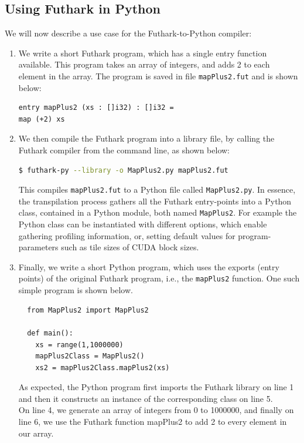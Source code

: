 \subsection{Using Futhark in Python}
We will now describe a use case for the Futhark-to-Python compiler:
\begin{enumerate}
\item We write a short Futhark program, which has a single entry function
    available. This program takes an array of integers, and
    adds 2 to each element in the array. The program is saved in file 
    {\tt mapPlus2.fut} and is shown below: %
\begin{lstlisting}[language=Futhark]
entry mapPlus2 (xs : []i32) : []i32 =
map (+2) xs
\end{lstlisting}

\item We then compile the Futhark program into a library file, by calling the
  Futhark compiler from the command line, as shown below: %
  \begin{lstlisting}[language=bash]
  $ futhark-py --library -o MapPlus2.py mapPlus2.fut
  \end{lstlisting}
  This compiles \texttt{mapPlus2.fut} to a Python file called {\tt MapPlus2.py}.
  In essence, the transpilation process gathers all the Futhark entry-points into 
  a Python class, contained in a Python module, both named {\tt MapPlus2}.
  For example the Python class can be instantiated with different options,  
    which enable gathering profiling information, or, setting default values
    for program-parameters such as tile sizes of CUDA block sizes.

\item 
    Finally, we write a short Python program, which uses the exports (entry points) 
    of the original Futhark program, i.e., the {\tt mapPlus2} function.
    One such simple program is shown below.
    \begin{verbatim}
  from MapPlus2 import MapPlus2

  def main():
    xs = range(1,1000000)
    mapPlus2Class = MapPlus2()
    xs2 = mapPlus2Class.mapPlus2(xs)
  \end{verbatim}
  As expected, the Python program first imports the Futhark library on line 
    1 and then it constructs an instance of the corresponding class on line 5.\\
  On line 4, we generate an array of integers from 0 to 1000000, and finally
  on line 6, we use the Futhark function mapPlus2 to add 2 to every
  element in our array.
\end{enumerate}

